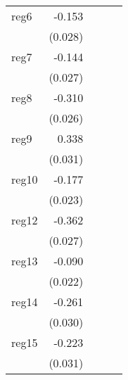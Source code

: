 {\begin{longtable}{l*{4}{D{.}{.}{-1}}}
\addlinespace
reg6        &      -0.153\sym{***}&                     &                     &                     \\
            &     (0.028)         &                     &                     &                     \\
\addlinespace
reg7        &      -0.144\sym{***}&                     &                     &                     \\
            &     (0.027)         &                     &                     &                     \\
\addlinespace
reg8        &      -0.310\sym{***}&                     &                     &                     \\
            &     (0.026)         &                     &                     &                     \\
\addlinespace
reg9        &       0.338\sym{***}&                     &                     &                     \\
            &     (0.031)         &                     &                     &                     \\
\addlinespace
reg10       &      -0.177\sym{***}&                     &                     &                     \\
            &     (0.023)         &                     &                     &                     \\
\addlinespace
reg12       &      -0.362\sym{***}&                     &                     &                     \\
            &     (0.027)         &                     &                     &                     \\
\addlinespace
reg13       &      -0.090\sym{***}&                     &                     &                     \\
            &     (0.022)         &                     &                     &                     \\
\addlinespace
reg14       &      -0.261\sym{***}&                     &                     &                     \\
            &     (0.030)         &                     &                     &                     \\
\addlinespace
reg15       &      -0.223\sym{***}&                     &                     &                     \\
            &     (0.031)         &                     &                     &                     \\

\end{longtable}}
